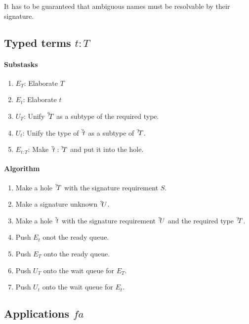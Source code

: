 It has to be guaranteed that ambiguous names must be resolvable by their
signature.








\subsection{Typed terms $t: T$}

\paragraph{Substasks}
\begin{enumerate}
    \item $E_T$: Elaborate $T$
    \item $E_t$: Elaborate $t$
    \item $U_T$: Unify ${{}^? \kern-0.2em T}$ as a subtype of the required type.
    \item $U_t$: Unify the type of ${{}^? \kern-0.2em t}$ as a subtype of ${{}^? \kern-0.2em T}$.
    \item $E_{t:T}$: Make ${{}^? \kern-0.2em t}: {{}^? \kern-0.2em T}$ and put it into the hole.
\end{enumerate}

\paragraph{Algorithm}
\begin{enumerate}
    \item Make a hole ${{}^? \kern-0.2em T}$ with the signature requirement $S$.
    \item Make a signature unknown ${{}^? \kern-0.2em U}$.
    \item Make a hole ${{}^? \kern-0.2em t}$ with the signature requirement ${{}^? \kern-0.2em U}$ and the
        required type ${{}^? \kern-0.2em T}$.

    \item Push $E_t$ onot the ready queue.
    \item Push $E_T$ onto the ready queue.
    \item Push $U_T$ onto the wait queue for $E_T$.
    \item Push $U_t$ onto the wait queue for $E_t$.
\end{enumerate}








\subsection{Applications $f a$}



